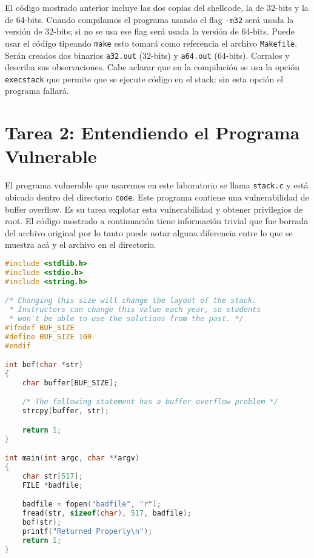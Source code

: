 El código mostrado anterior incluye las dos copias del shellcode, la de 32-bits y la de 64-bits. Cuando compilamos el programa usando el flag \texttt{-m32} será usada la versión de 32-bits; si no se usa ese flag será usada la versión de 64-bits. 
Puede usar el código tipeando \texttt{make} esto tomará como referencia el archivo  \texttt{Makefile}.
Serán creados dos binarios \texttt{a32.out} (32-bits) y \texttt{a64.out} (64-bits).
Corralos y describa sus observaciones.
Cabe aclarar que en la compilación se usa la opción \texttt{execstack} que permite que se ejecute código en el stack: sin esta opción el programa fallará.




\section{Tarea 2: Entendiendo el Programa Vulnerable}
\label{sec:vulnerable_program}

El programa vulnerable que usaremos en este laboratorio se llama \texttt{stack.c} y está ubicado dentro del directorio  \texttt{code}.
Este programa contiene una vulnerabilidad de buffer overflow. Es su tarea explotar esta vulnerabilidad y obtener privilegios de root.
El código mostrado a continuación tiene información trivial que fue borrada del archivo original por lo tanto puede notar alguna diferencia entre lo que se muestra acá y el archivo en el directorio.

\begin{lstlisting}[language=C, caption={The vulnerable program (\texttt{stack.c})}]
#include <stdlib.h>
#include <stdio.h>
#include <string.h>

/* Changing this size will change the layout of the stack.
 * Instructors can change this value each year, so students
 * won't be able to use the solutions from the past. */
#ifndef BUF_SIZE
#define BUF_SIZE 100
#endif

int bof(char *str)
{
    char buffer[BUF_SIZE];

    /* The following statement has a buffer overflow problem */ 
    strcpy(buffer, str);          

    return 1;
}

int main(int argc, char **argv)
{
    char str[517];
    FILE *badfile;

    badfile = fopen("badfile", "r");
    fread(str, sizeof(char), 517, badfile);
    bof(str);
    printf("Returned Properly\n");
    return 1;
}
\end{lstlisting}


